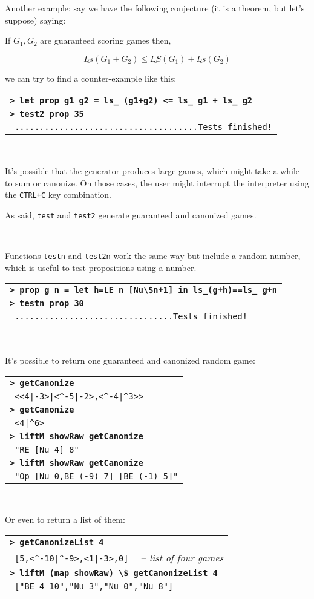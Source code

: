 \documentclass[a4paper,12pt]{article}
\newcommand{\bash}[1]{\small\textbf{\lstinline§> #1§}\\}
\newcommand{\out}[1]{\small\lstinline§ #1§}
\newcommand{\hsklcmt}[1]{~~-- \footnotesize\textit{#1}}
\newcommand{\haskellCode}{\fontfamily{pcr}\selectfont}
\newenvironment{sgcode}
	{ \haskellCode
	  \begin{tabular}{|p{0.9\textwidth}|}
      \hline	
	}
	{ \\\hline  
      \end{tabular} \\
	  \par 
	}
\begin{document}
Another example: say we have the following conjecture (it is a theorem, but let's suppose) saying:

If $G_1, G_2$ are guaranteed scoring games then,

$$\underline{Ls}(G_1+G_2) \leq \underline{LS}(G_1) + \underline{Ls}(G_2)$$

we can try to find a counter-example like this:

\begin{sgcode}
\bash{let prop g1 g2 = ls_ (g1+g2) <= ls_ g1 + ls_ g2}
\bash{test2 prop 35}
\out{.....................................Tests finished!} 
\end{sgcode}

It's possible that the generator produces large games, which might take
a while to sum or canonize. On those cases, the user might interrupt the interpreter
using the \verb|CTRL+C| key combination.

As said, \verb|test| and \verb|test2| generate guaranteed and canonized games.

~

Functions \verb|testn| and \verb|test2n| work the same way but include a random number, which
is useful to test propositions using a number.

\begin{sgcode}
\bash{prop g n = let h=LE n [Nu\$n+1] in ls_(g+h)==ls_ g+n}
\bash{testn prop 30}
\out{................................Tests finished!} 
\end{sgcode}

It's possible to return one guaranteed and canonized random game:

\begin{sgcode}
\bash{getCanonize}
\out{<<4|-3>|<^-5|-2>,<^-4|^3>>} \\
\bash{getCanonize}
\out{<4|^6>} \\
\bash{liftM showRaw getCanonize}
\out{"RE [Nu 4] 8"} \\
\bash{liftM showRaw getCanonize}
\out{"Op [Nu 0,BE (-9) 7] [BE (-1) 5]"}
\end{sgcode}

Or even to return a list of them:

\begin{sgcode}
\bash{getCanonizeList 4}
\out{[5,<^-10|^-9>,<1|-3>,0]} \hsklcmt{list of four games} \\ 
\bash{liftM (map showRaw) \$ getCanonizeList 4}
\out{["BE 4 10","Nu 3","Nu 0","Nu 8"]}
\end{sgcode}
\end{document}
